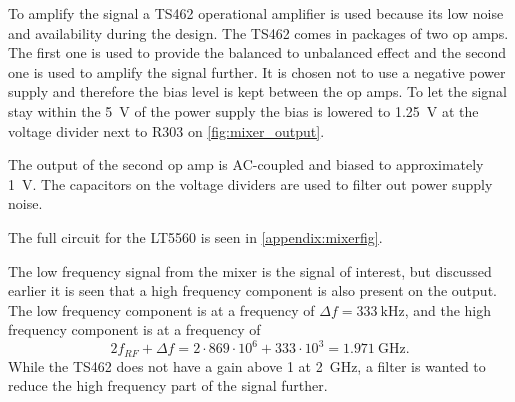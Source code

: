 To amplify the signal a TS462 operational amplifier is used because its low noise and availability during the design. The TS462 comes in packages of two op amps. The first one is used to provide the balanced to unbalanced effect and the second one is used to amplify the signal further. It is chosen not to use a negative power supply and therefore the bias level is kept between the op amps. To let the signal stay within the \SI{5}{\volt} of the power supply the bias is lowered to \SI{1,25}{\volt} at the voltage divider next to R303 on \autoref{fig:mixer_output}. 

The output of the second op amp is AC-coupled and biased to approximately \SI{1}{\volt}. The capacitors on the voltage dividers are used to filter out power supply noise.

The full circuit for the LT5560 is seen in \autoref{appendix:mixerfig}. 


The low frequency signal from the mixer is the signal of interest, but discussed earlier it is seen that a high frequency component is also present on the output. The low frequency component is at a frequency of $\Delta f = \SI{333}{\kilo\hertz}$, and the high frequency component is at a frequency of 
\[ 2f_{RF} + \Delta f = 2 \cdot 869 \cdot 10^{6} + 333 \cdot 10^{3} = \SI{1,971}{\giga\hertz}.\]
While the TS462 does not have a gain above 1 at \SI{2}{\giga\hertz}, a filter is wanted to reduce the high frequency part of the signal further.

